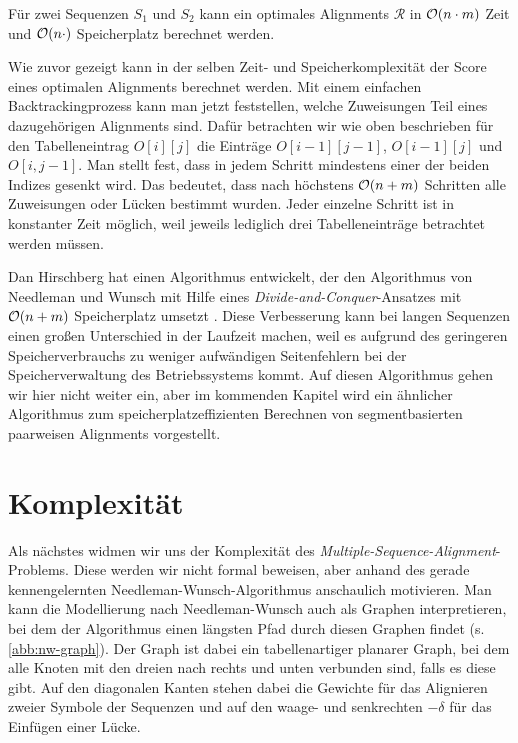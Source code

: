 \begin{korollar}
	Für zwei Sequenzen $S_1$ und $S_2$ kann ein optimales Alignments $\mathcal{R}$ in $\mathcal{O}(n\cdot m)$ Zeit und $\mathcal{O}(n\cdot)$ Speicherplatz berechnet werden.
\end{korollar}

\begin{beweis}
	Wie zuvor gezeigt kann in der selben Zeit- und Speicherkomplexität der Score eines optimalen Alignments berechnet werden. Mit einem einfachen Backtrackingprozess kann man jetzt feststellen, welche Zuweisungen Teil eines dazugehörigen Alignments sind. Dafür betrachten wir wie oben beschrieben für den Tabelleneintrag $O[i][j]$ die Einträge  $O[i-1][j-1]$, $O[i-1][j]$ und $O[i,j-1]$. Man stellt fest, dass in jedem Schritt mindestens einer der beiden Indizes gesenkt wird. Das bedeutet, dass nach höchstens $\mathcal{O}(n+m)$ Schritten alle Zuweisungen oder Lücken bestimmt wurden. Jeder einzelne Schritt ist in konstanter Zeit möglich, weil jeweils lediglich drei Tabelleneinträge betrachtet werden müssen. 
\end{beweis}

Dan Hirschberg hat einen Algorithmus entwickelt, der den Algorithmus von Needleman und Wunsch mit Hilfe eines \emph{Divide-and-Conquer}-Ansatzes mit $\mathcal{O}(n+m)$ Speicherplatz umsetzt \cite{h75}. Diese Verbesserung kann bei langen Sequenzen einen großen Unterschied in der Laufzeit machen, weil es aufgrund des geringeren Speicherverbrauchs zu weniger aufwändigen Seitenfehlern bei der Speicherverwaltung des Betriebssystems kommt. Auf diesen Algorithmus gehen wir hier nicht weiter ein, aber im kommenden Kapitel wird ein ähnlicher Algorithmus zum speicherplatzeffizienten Berechnen von segmentbasierten paarweisen Alignments vorgestellt.

\section{Komplexität}

Als nächstes widmen wir uns der Komplexität des \emph{Multiple-Sequence-Alignment}-Problems. Diese werden wir nicht formal beweisen, aber anhand des gerade kennengelernten Needleman-Wunsch-Algorithmus anschaulich motivieren. Man kann die Modellierung nach Needleman-Wunsch auch als Graphen interpretieren, bei dem der Algorithmus einen längsten Pfad durch diesen Graphen findet (s. \ref{abb:nw-graph}). Der Graph ist dabei ein tabellenartiger planarer Graph, bei dem alle Knoten mit den dreien nach rechts und unten verbunden sind, falls es diese gibt. Auf den diagonalen Kanten stehen dabei die Gewichte für das Alignieren zweier Symbole der Sequenzen und auf den waage- und senkrechten $-\delta$ für das Einfügen einer Lücke.

